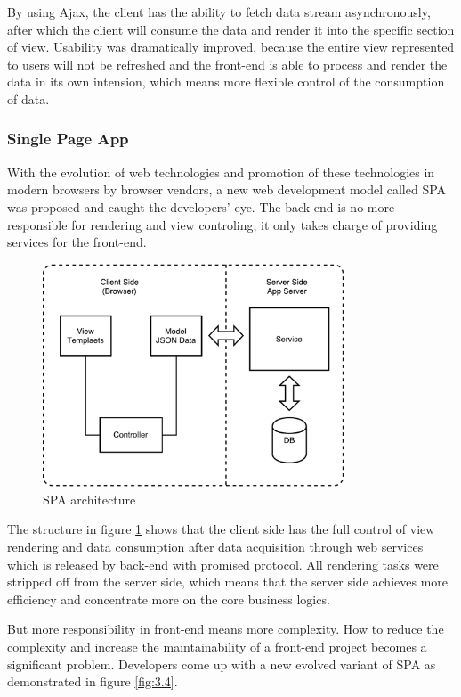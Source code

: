 By using Ajax, the client has the ability to fetch data stream asynchronously, after which the client will consume the data and render it into the specific section of view. Usability was dramatically improved, because the entire view represented to users will not be refreshed and the front-end is able to process and render the data in its own intension, which means more flexible control of the consumption of data.

\subsubsection{Single Page App}

With the evolution of web technologies and promotion of these technologies in modern browsers by browser vendors, a new web development model called \gls{SPA} was proposed and caught the developers' eye. The back-end is no more responsible for rendering and view controling, it only takes charge of providing services for the front-end.

\begin{figure}[!htbp]
  \centering
    \includegraphics[width=0.8\textwidth]{Figures/tech-web-arch-spa.pdf}
  \caption{SPA architecture}
  \label{fig:3.3}
\end{figure}

The structure in figure \ref{fig:3.3} shows that the client side has the full control of view rendering and data consumption after data acquisition through web services which is released by back-end with promised protocol. All rendering tasks were stripped off from the server side, which means that the server side achieves more efficiency and concentrate more on the core business logics\cite{brandon2008software}.

But more responsibility in front-end means more complexity. How to reduce the complexity and increase the maintainability of a front-end project becomes a significant problem. Developers come up with a new evolved variant of SPA as demonstrated in figure \ref{fig:3.4}.

